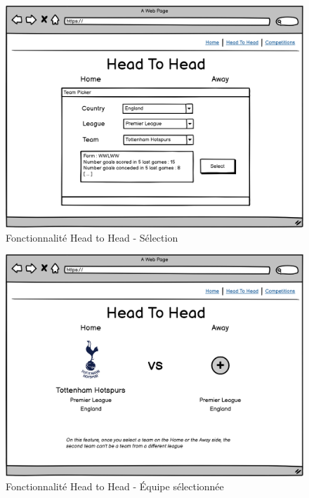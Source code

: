 \documentclass[a4paper,14pt]{extarticle}
\begin{document}
{\begin{figure}[H]
    \centering
    \includegraphics[width=13cm]{../img/maquetteH2H_2.png}
    \caption{Fonctionnalité Head to Head - Sélection}
    \label{fig:maquetteH2H_2}
\end{figure}

\begin{figure}[H]
    \centering
    \includegraphics[width=13cm]{../img/maquetteH2H_3.png}
    \caption{Fonctionnalité Head to Head - Équipe sélectionnée}
    \label{fig:maquetteH2H_3}
\end{figure}

}
\end{document}
